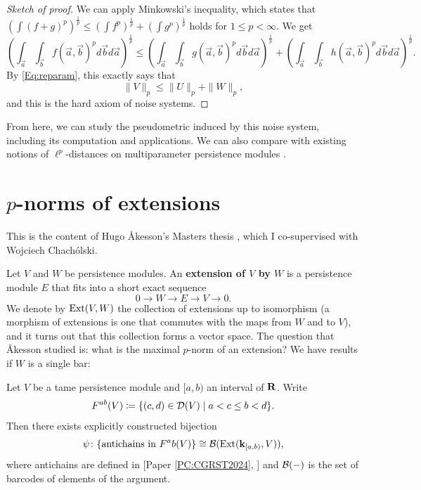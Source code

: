 \begin{proof}[Sketch of proof]
  We can apply Minkowski's inequality, which states that $(\int (f + g)^p)^{\frac 1p} \leq (\int f^p)^{\frac 1p} + (\int g^p)^{\frac 1p}$ holds for $1 \leq p < \infty$. We get
  \[
    \left( \int_{\vec{a}} \int_{\vec{b}} f(\vec{a}, \vec{b})^p d\vec{b} d\vec{a} \right)^{\frac{1}{p}} \leq \left( \int_{\vec{a}} \int_{\vec{b}} g(\vec{a}, \vec{b})^p d\vec{b} d\vec{a} \right)^{\frac{1}{p}} + \left( \int_{\vec{a}} \int_{\vec{b}} h(\vec{a}, \vec{b})^p d\vec{b} d\vec{a} \right)^{\frac{1}{p}}.
  \]
  By \eqref{Eq:reparam}, this exactly says that
  \[
    \| V \|_p \leq \| U \|_p + \| W \|_p,
  \]
  and this is the hard axiom of noise systems.
\end{proof}

From here, we can study the pseudometric induced by this noise system, including its computation and applications. We can also compare with existing notions of $\ell^p$-distances on multiparameter persistence modules \cite{BakkeBjerkevikLesnick2021}. 

\section{\texorpdfstring{$p$}{p}-norms of extensions}

This is the content of Hugo Åkesson's Masters thesis \cite{Åkesson2023}, which I co-supervised with Wojciech Chachólski.

Let $V$ and $W$ be persistence modules. An \textbf{extension of $V$ by $W$} is a persistence module $E$ that fits into a short exact sequence
\[
  0 \to W \to E \to V \to 0.
\]
We denote by $\operatorname{Ext}(V, W)$ the collection of extensions up to isomorphism (a morphism of extensions is one that commutes with the maps from $W$ and to $V$), and it turns out that this collection forms a vector space.
The question that Åkesson studied is: what is the maximal $p$-norm of an extension? We have results if $W$ is a single bar:

\begin{theorem}
\label{T:antichain-extensions-1}
  Let $V$ be a tame persistence module and $[a, b)$ an interval of $\mathbf{R}$. Write
  \[
    F^{ab}(V) \coloneq \{(c, d) \in \mathcal{D}(V) \mid a < c \leq b < d\}.
  \]
  Then there exists explicitly constructed bijection
  \[
    \psi \colon \{ \text{antichains in } F^ab(V) \} \cong \mathcal{B}(\operatorname{Ext}(\mathbf{k}_{[a, b)}, V)),
  \]
  where antichains are defined in [Paper \ref{PC:CGRST2024}, ] and $\mathcal{B}(-)$ is the set of barcodes of elements of the argument.
\end{theorem}

